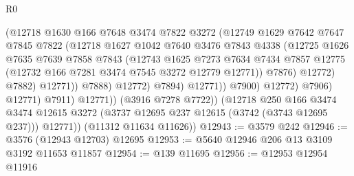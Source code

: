 \begin{lexlean}{R0}
\begin{coremodule}
                                    (@12718
                                      @1630
                                      @166
                                      @7648
                                      @3474
                                      @7822
                                      @3272
                                      (@12749
                                        @1629
                                        @7642
                                        @7647
                                        @7845
                                        @7822
                                        (@12718
                                          @1627
                                          @1042
                                          @7640
                                          @3476
                                          @7843
                                          @4338
                                          (@12725
                                            @1626
                                            @7635
                                            @7639
                                            @7858
                                            @7843
                                            (@12743
                                              @1625
                                              @7273
                                              @7634
                                              @7434
                                              @7857
                                              @12775
                                              (@12732 @166 @7281 @3474 @7545 @3272 @12779 @12771))
                                            @7876)
                                          @12772)
                                        @7882)
                                      @12771))
                                  @7888)
                                @12772)
                              @7894)
                            @12771))
                        @7900)
                      @12772)
                    @7906)
                  @12771)
                @7911)
              @12771))
          (@3916 @7278 @7722))
        (@12718
          @250
          @166
          @3474
          @3474
          @12615
          @3272
          (@3737 @12695 @237 @12615 (@3742 (@3743 @12695 @237)))
          @12771))
      (@11312 @11634 @11626))
@12943 := @3579 @242
@12946 := @3576 (@12943 @12703) @12695
@12953 := @5640 @12946 @206 @13 @3109 @3192 @11653 @11857
@12954 := @139 @11695
@12956 := @12953 @12954 @11916

\end{coremodule}
\end{lexlean}
